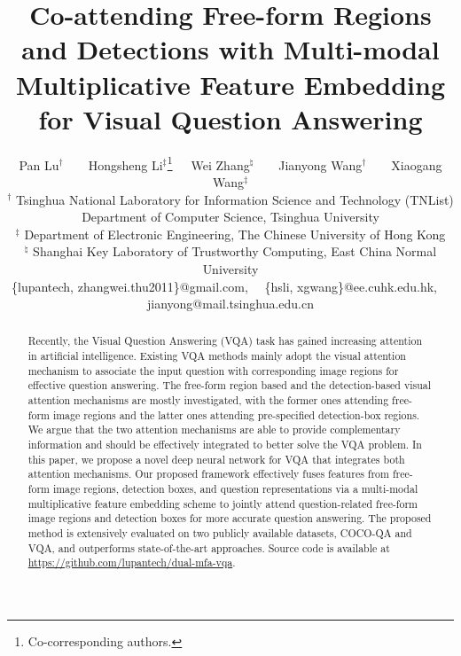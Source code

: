 \documentclass[letterpaper]{article}
\begin{document}
	
	
\title{Co-attending Free-form Regions and Detections with Multi-modal Multiplicative Feature Embedding for Visual Question Answering}



\author{Pan Lu$^{\dagger}$~~~~Hongsheng Li$^\ddag$\thanks{Co-corresponding authors.}~~~Wei Zhang$^\natural$~~~~Jianyong Wang$^\dagger$~~~~Xiaogang Wang$^\ddag$\footnotemark[1]\\
	$^\dagger$ Tsinghua National Laboratory for Information Science and Technology (TNList)\\
	Department of Computer Science, Tsinghua University\\
	$^\ddag$ Department of Electronic Engineering, The Chinese University of Hong Kong\\
	$^\natural$ Shanghai Key Laboratory of Trustworthy Computing, East China Normal University\\
	\{lupantech, zhangwei.thu2011\}@gmail.com,~~
	\{hsli, xgwang\}@ee.cuhk.edu.hk,~~
	jianyong@mail.tsinghua.edu.cn
}
\maketitle

\begin{abstract}


Recently, the Visual Question Answering (VQA) task has gained increasing attention in artificial intelligence. Existing VQA methods mainly adopt the visual attention mechanism to associate the input question with corresponding image regions for effective question answering. The free-form region based and the detection-based visual attention mechanisms are mostly investigated, with the former ones attending free-form image regions and the latter ones attending pre-specified detection-box regions. We argue that the two attention mechanisms are able to provide complementary information and should be effectively integrated to better solve the VQA problem. In this paper, we propose a novel deep neural network for VQA that integrates both attention mechanisms. Our proposed framework effectively fuses features from free-form image regions, detection boxes, and question representations via a multi-modal multiplicative feature embedding scheme to jointly attend question-related free-form image regions and detection boxes for more accurate question answering. The proposed method is extensively evaluated on two publicly available datasets, COCO-QA and VQA, and outperforms state-of-the-art approaches. Source code is available at \url{https://github.com/lupantech/dual-mfa-vqa}.



\end{abstract}
\end{document}
